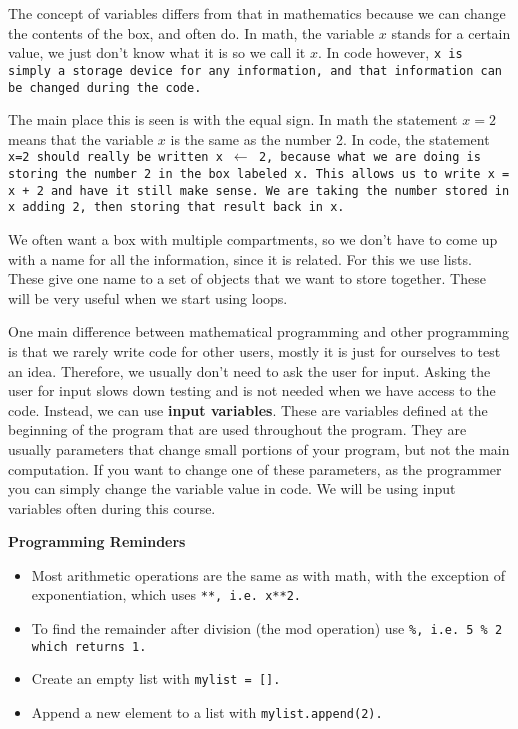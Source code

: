 \documentclass{article}
\def\prog#1{
\vspace{.1in}\begin{mdframed} \begin{center} \textbf{Programming Reminders} \end{center}#1 \end{mdframed} }
\begin{document}
	The concept of variables differs from that in mathematics because we can change the contents of the box, and often do.  In math, the variable $x$ stands for a certain value, we just don't know what it is so we call it $x$.  In code however, \tt{x} is simply a storage device for any information, and that information can be changed during the code.
	
	The main place this is seen is with the equal sign.  In math the statement $x=2$ means that the variable $x$ is the same as the number 2.  In code, the statement \tt{x=2} should really be written \tt{x} $\leftarrow$ \tt{2}, because what we are doing is storing the number 2 in the box labeled \tt{x}.  This allows us to write \tt{x = x + 2} and have it still make sense.  We are taking the number stored in \tt{x} adding 2, then storing that result back in \tt{x}.
	
	We often want a box with multiple compartments, so we don't have to come up with a name for all the information, since it is related.  For this we use lists.  These give one name to a set of objects that we want to store together.  These will be very useful when we start using loops.
	
	One main difference between mathematical programming and other programming is that we rarely write code for other users, mostly it is just for ourselves to test an idea.  Therefore, we usually don't need to ask the user for input.  Asking the user for input slows down testing and is not needed when we have access to the code.  Instead, we can use \textbf{input variables}.  These are variables defined at the beginning of the program that are used throughout the program.  They are usually parameters that change small portions of your program, but not the main computation.  If you want to change one of these parameters, as the programmer you can simply change the variable value in code.  We will be using input variables often during this course.
	
	
	
	
	\prog{
		\begin{itemize}
			\item Most arithmetic operations are the same as with math, with the exception of exponentiation, which uses \tt{**}, i.e. \tt{x**2}.
			\item To find the remainder after division (the mod operation) use \tt{\%}, i.e. \tt{5 \% 2} which returns 1.
			\item Create an empty list with \tt{mylist = []}.
			\item Append a new element to a list with \tt{mylist.append(2)}.
		\end{itemize}
		}
\end{document}
